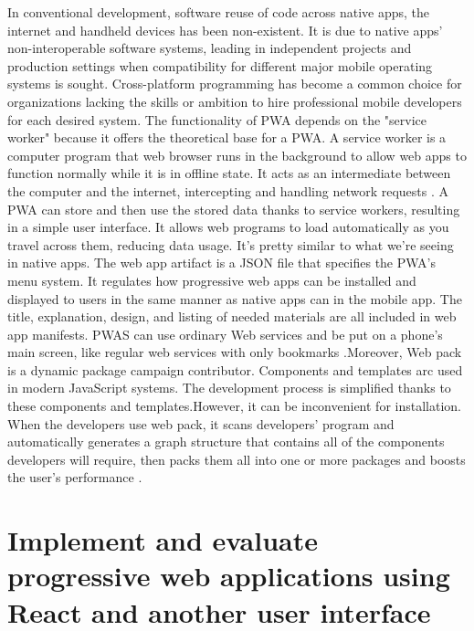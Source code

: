 \documentclass{article}
\begin{document}
In conventional development, software reuse of code across native apps, the internet and handheld devices has been non-existent. It is due to native apps' non-interoperable software systems, leading in independent projects and production settings when compatibility for different major mobile operating systems is sought. Cross-platform programming has become a common choice for organizations lacking the skills or ambition to hire professional mobile developers for each desired system. The functionality of PWA depends on the "service worker" because it offers the theoretical base for a PWA. A service worker is a computer program that web browser runs in the background to allow web apps to function normally while it is in offline state. It acts as an intermediate between the computer and the internet, intercepting and handling network requests \cite{mercArticle}. A PWA can store and then use the stored data thanks to service workers, resulting in a simple user interface. It allows web programs to load automatically as you travel across them, reducing data usage. It's pretty similar to what we're seeing in native apps. The web app artifact is a JSON file that specifies the PWA's menu system. It regulates how progressive web apps can be installed and displayed to users in the same manner as native apps can in the mobile app. The title, explanation, design, and listing of needed materials are all included in web app manifests. PWAS can use ordinary Web services and be put on a phone's main screen, like regular web services with only bookmarks \cite{rbArticle}.Moreover, Web pack is a dynamic package campaign contributor. Components and templates arc used in modern JavaScript systems. The development process is simplified thanks to these components and templates.However, it can be inconvenient for installation. When the developers use web pack, it scans developers' program and automatically generates a graph structure that contains all of the components developers will require, then packs them all into one or more packages and boosts the user's performance \cite{gcArticle}. 

\section*{Implement and evaluate progressive web applications using React and another user interface}
\end{document}
